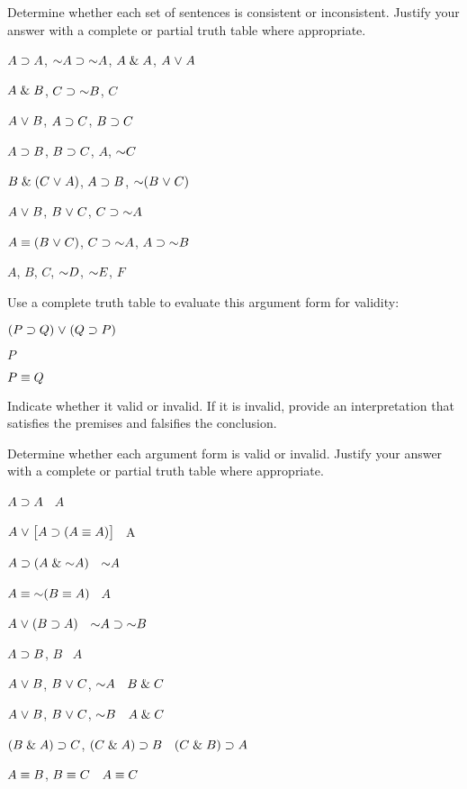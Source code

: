 \solutions
\problempart
\label{pr.TT.consistent}
Determine whether each set of sentences is consistent or inconsistent. Justify your answer with a complete or partial truth table where appropriate.
\begin{earg}
\item $A\supset A$, $\enot A \eif \enot A$, $A\mathrel\& A$, $A\mkern1mu\vee\mkern1mu A$ %
\item $A \mathrel\& B$, $C\eif \enot B$, $C$ %
\item $A\mkern1mu\vee\mkern1mu B$, $A\supset C$, $B\supset C$ %
\item $A\supset B$, $B\supset C$, $A$, $\enot C$ %
\item $B\mathrel\&(C\mkern1mu\vee\mkern1mu A)$, $A\supset B$, $\enot(B\eor C)$  %
\item $A \mkern1mu\vee\mkern1mu B$, $B\mkern1mu\vee\mkern1mu C$, $C\eif \enot A$ %
\item $A\equiv(B\mkern1mu\vee\mkern1mu C)$, $C\eif \enot A$, $A\eif \enot B$ %
\item $A$, $B$, $C$, $\enot D$, $\enot E$, $F$ %
\end{earg}




\problempart
\label{HW3.B}

Use a complete truth table to evaluate this argument form for validity:

\begin{earg}
\item[] $(P \supset Q) \mkern1mu\vee\mkern1mu (Q \supset P)$
\item[] $P$
\item[\therefore] $P\equiv Q$
\end{earg}

Indicate whether it valid or invalid. If it is invalid, provide an interpretation that satisfies the premises and falsifies the conclusion. 




\solutions
\problempart
\label{pr.TT.valid}
Determine whether each argument form is valid or invalid. Justify your answer with a complete or partial truth table where appropriate.
\begin{earg}
\item $A\supset A$ \therefore\ $A$ %
\item $A\mkern1mu\vee\mkern1mu\bigl[A\supset(A\equiv A)\bigr]$ \therefore\ A %
\item $A\eif(A\eand\enot A)$ \therefore\ $\enot A$ %
\item $A\eiff\enot(B\eiff A)$ \therefore\ $A$ %
\item $A\mkern1mu\vee\mkern1mu(B\supset A)$ \therefore\ $\enot A \eif \enot B$ %
\item $A\supset B$, $B$ \therefore\ $A$ %
\item $A\mkern1mu\vee\mkern1mu B$, $B\mkern1mu\vee\mkern1mu C$, $\enot A$ \therefore\ $B \mathrel\& C$ %
\item $A\mkern1mu\vee\mkern1mu B$, $B\mkern1mu\vee\mkern1mu C$, $\enot B$ \therefore\ $A \mathrel\& C$ %
\item $(B\mathrel\& A)\supset C$, $(C\mathrel\& A)\supset B$ \therefore\ $(C\mathrel\& B)\supset A$ %
\item $A\equiv B$, $B\equiv C$ \therefore\ $A\equiv C$ %
\end{earg}

